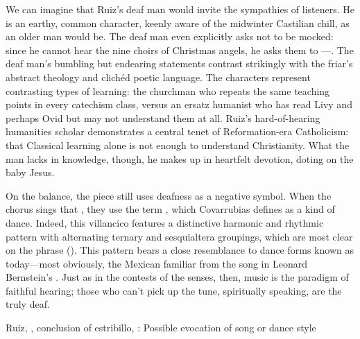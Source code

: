 We can imagine that Ruiz's deaf man would invite the sympathies of listeners.
He is an earthy, common character, keenly aware of the midwinter Castilian
chill, as an older man would be.
The deaf man even explicitly asks not to be mocked: since he cannot hear the
nine choirs of Christmas angels, he asks them to ---.
The deaf man's bumbling but endearing statements contrast strikingly with the
friar's abstract theology and clichéd poetic language.
The characters represent contrasting types of learning: the churchman who
repeats the same teaching points in every catechism class, versus an ersatz
humanist who has read Livy and perhaps Ovid but may not understand them at all.
Ruiz's hard-of-hearing humanities scholar demonstrates a central tenet of
Reformation-era Catholicism: that Classical learning alone is not enough to
understand Christianity.%
    \Autocite[206]{Erasmus:Dolan}
What the man lacks in knowledge, though, he makes up in heartfelt devotion,
doting on the baby Jesus.


On the balance, the piece still uses deafness as a negative symbol.  
When the chorus sings that , they use the term , which Covarrubias defines
as a kind of dance.
Indeed, this villancico features a distinctive harmonic and rhythmic pattern
with alternating ternary and sesquialtera groupings, which are most clear on the
phrase 
().
This pattern bears a close resemblance to dance forms known as 
today---most obviously, the Mexican  familiar from the song
 in Leonard Bernstein's .%
    \Autocites
    []{Grove}
    {Wells:WestSideStory}
Just as in the contests of the senses, then, music is the paradigm of faithful
hearing; those who can't pick up the tune, spiritually speaking, are the truly
deaf.


\begin{musicexample}
    \caption{Ruiz, , conclusion of
    estribillo, : Possible evocation of  song or
    dance style}
    \label{mus:Ruiz-Sordos-son}
\end{musicexample}

